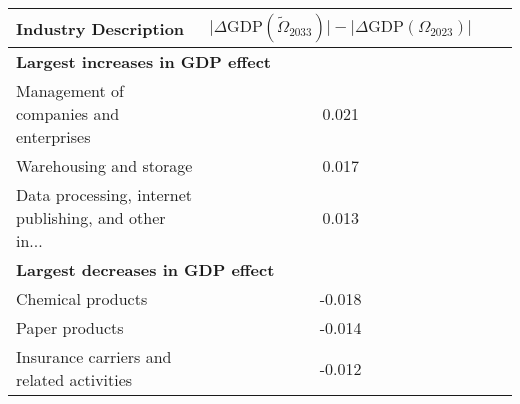 \begin{tabular}{lccc}
\toprule
Industry Description & $\lvert \Delta \text{GDP}(\tilde{\Omega}_{2033}) \rvert - \lvert \Delta \text{GDP}(\Omega_{2023}) \rvert$ \\
\midrule
\midrule
\multicolumn{2}{l}{\textbf{Largest increases in GDP effect}} \\
\midrule
Management of companies and enterprises & 0.021 \\
Warehousing and storage & 0.017 \\
Data processing, internet publishing, and other in... & 0.013 \\
\midrule
\multicolumn{2}{l}{\textbf{Largest decreases in GDP effect}} \\
\midrule
Chemical products & -0.018 \\
Paper products & -0.014 \\
Insurance carriers and related activities & -0.012 \\
\bottomrule
\end{tabular}